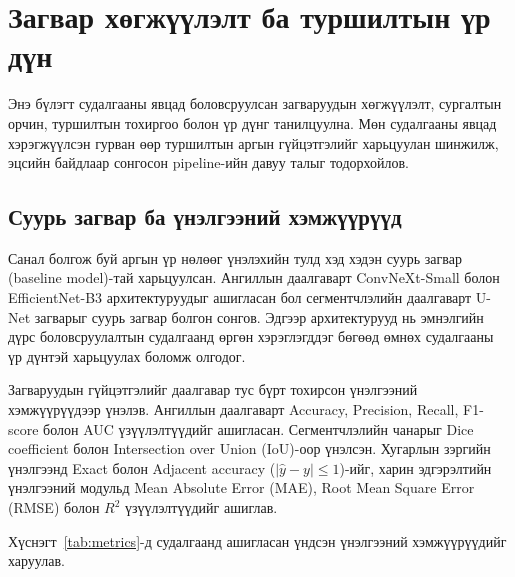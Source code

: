
\chapter{Загвар хөгжүүлэлт ба туршилтын үр дүн}
\label{Chapter5}
\pagecolor{Beige}

Энэ бүлэгт судалгааны явцад боловсруулсан загваруудын хөгжүүлэлт, сургалтын орчин, туршилтын тохиргоо болон үр дүнг танилцуулна. Мөн судалгааны явцад хэрэгжүүлсэн гурван өөр туршилтын аргын гүйцэтгэлийг харьцуулан шинжилж, эцсийн байдлаар сонгосон pipeline-ийн давуу талыг тодорхойлов.

\section{Суурь загвар ба үнэлгээний хэмжүүрүүд}

Санал болгож буй аргын үр нөлөөг үнэлэхийн тулд хэд хэдэн суурь загвар (baseline model)-тай харьцуулсан. Ангиллын даалгаварт ConvNeXt-Small болон EfficientNet-B3 архитектуруудыг ашигласан бол сегментчлэлийн даалгаварт U-Net загварыг суурь загвар болгон сонгов. Эдгээр архитектурууд нь эмнэлгийн дүрс боловсруулалтын судалгаанд өргөн хэрэглэгддэг бөгөөд өмнөх судалгааны үр дүнтэй харьцуулах боломж олгодог.

Загваруудын гүйцэтгэлийг даалгавар тус бүрт тохирсон үнэлгээний хэмжүүрүүдээр үнэлэв. Ангиллын даалгаварт Accuracy, Precision, Recall, F1-score болон AUC үзүүлэлтүүдийг ашигласан. Сегментчлэлийн чанарыг Dice coefficient болон Intersection over Union (IoU)-оор үнэлсэн. Хугарлын зэргийн үнэлгээнд Exact болон Adjacent accuracy ($|\hat{y}-y|\leq1$)-ийг, харин эдгэрэлтийн үнэлгээний модульд Mean Absolute Error (MAE), Root Mean Square Error (RMSE) болон $R^2$ үзүүлэлтүүдийг ашиглав.

Хүснэгт~\ref{tab:metrics}-д судалгаанд ашигласан үндсэн үнэлгээний хэмжүүрүүдийг харуулав.


